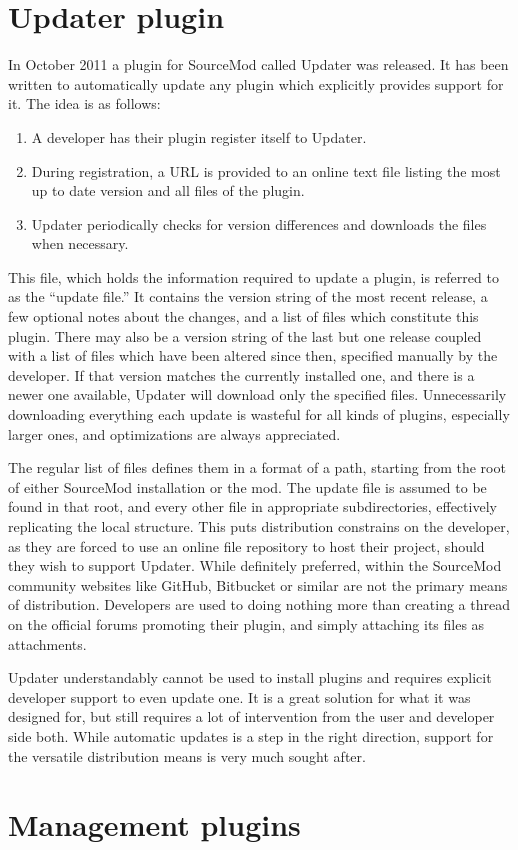 \section{Updater plugin}
\label{updater-plugin}

In October 2011 a plugin for SourceMod called Updater was released.
It has been written to automatically update any plugin which explicitly provides support for it.
The idea is as follows:

\begin{enumerate}
    \item A developer has their plugin register itself to Updater.
    \item During registration, a URL is provided to an online text file listing the most up to date version and all files of the plugin.
    \item Updater periodically checks for version differences and downloads the files when necessary.
\end{enumerate}

This file, which holds the information required to update a plugin, is referred to as the ``update file.''
It contains the version string of the most recent release, a few optional notes about the changes, and a list of files which constitute this plugin.
There may also be a version string of the last but one release coupled with a list of files which have been altered since then, specified manually by the developer.
If that version matches the currently installed one, and there is a newer one available, Updater will download only the specified files.
Unnecessarily downloading everything each update is wasteful for all kinds of plugins, especially larger ones, and optimizations are always appreciated.

The regular list of files defines them in a format of a path, starting from the root of either SourceMod installation or the mod.
The update file is assumed to be found in that root, and every other file in appropriate subdirectories, effectively replicating the local structure.
This puts distribution constrains on the developer, as they are forced to use an online file repository to host their project, should they wish to support Updater.
While definitely preferred, within the SourceMod community websites like GitHub, Bitbucket or similar are not the primary means of distribution.
Developers are used to doing nothing more than creating a thread on the official forums promoting their plugin, and simply attaching its files as attachments.

Updater understandably cannot be used to install plugins and requires explicit developer support to even update one.
It is a great solution for what it was designed for, but still requires a lot of intervention from the user and developer side both.
While automatic updates is a step in the right direction, support for the versatile distribution means is very much sought after.

\section{Management plugins}
